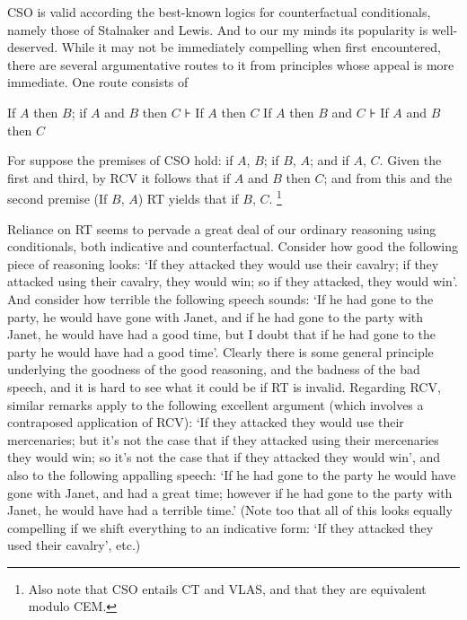 \documentclass[If.tex]{subfiles}
\begin{document}
CSO is valid according the best-known logics for counterfactual conditionals, namely those of Stalnaker and Lewis. And to our my minds its popularity is well-deserved. While it may not be immediately compelling when first encountered, there are several argumentative routes to it from principles whose appeal is more immediate. One route consists of
\begin{prop}  
	If $A$ then $B$; if $A$ and $B$ then $C$ ⊦ If $A$ then $C$ 
	If $A$ then $B$ and $C$ ⊦ If $A$ and $B$ then $C$
\end{prop}
For suppose the premises of CSO hold: if $A$, $B$; if $B$, $A$; and if $A$, $C$. Given the first and third, by RCV it follows that if $A$ and $B$ then $C$; and from this and the second premise (If $B$, $A$) RT yields that if $B$, $C$.%
\footnote{Also note that CSO entails CT and VLAS, and that they are equivalent modulo CEM.}


Reliance on RT seems to pervade a great deal of our ordinary reasoning using conditionals, both indicative and counterfactual. Consider how good the following piece of reasoning looks: ‘If they attacked they would use their cavalry; if they attacked using their cavalry, they would win; so if they attacked, they would win’. And consider how terrible the following speech sounds: ‘If he had gone to the party, he would have gone with Janet, and if he had gone to the party with Janet, he would have had a good time, but I doubt that if he had gone to the party he would have had a good time’. Clearly there is some general principle underlying the goodness of the good reasoning, and the badness of the bad speech, and it is hard to see what it could be if RT is invalid. Regarding RCV, similar remarks apply to the following excellent argument (which involves a contraposed application of RCV): ‘If they attacked they would use their mercenaries; but it's not the case that if they attacked using their mercenaries they would win; so it's not the case that if they attacked they would win’, and also to the following appalling speech: ‘If he had gone to the party he would have gone with Janet, and had a great time; however if he had gone to the party with Janet, he would have had a terrible time.’ (Note too that all of this looks equally compelling if we shift everything to an indicative form: ‘If they attacked they used their cavalry’, etc.)
\end{document}

